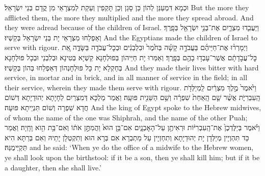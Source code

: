 {וּכְמָא דִּמְעַנַּן לְהוֹן כֵּן סָגַן וְכֵן תָּקְפִין וְעַקַת לְמִצְרָאֵי מִן קֳדָם בְּנֵי יִשְׂרָאֵל׃}
{But the more they afflicted them, the more they multiplied and the more they spread abroad. And they were adread because of the children of Israel.}{}
{וַיַּעֲבִ֧דוּ מִצְרַ֛יִם אֶת־בְּנֵ֥י יִשְׂרָאֵ֖ל בְּפָֽרֶךְ׃
}
{וְאַפְלַחוּ מִצְרָאֵי יָת בְּנֵי יִשְׂרָאֵל בְּקַשְׁיוּ׃}
{And the Egyptians made the children of Israel to serve with rigour.}{}
{וַיְמָרְר֨וּ אֶת־חַיֵּיהֶ֜ם בַּעֲבֹדָ֣ה קָשָׁ֗ה בְּחֹ֙מֶר֙ וּבִלְבֵנִ֔ים וּבְכׇל־עֲבֹדָ֖ה בַּשָּׂדֶ֑ה אֵ֚ת כׇּל־עֲבֹ֣דָתָ֔ם אֲשֶׁר־עָבְד֥וּ בָהֶ֖ם בְּפָֽרֶךְ׃}
{וְאַמַּרוּ יָת חַיֵּיהוֹן בְּפוּלְחָנָא קַשְׁיָא בְּטִינָא וּבְלִבְנֵי וּבְכָל פּוּלְחָנָא בְּחַקְלָא יָת כָּל פּוּלְחָנְהוֹן דְּאַפְלַחוּ בְּהוֹן בְּקַשְׁיוּ׃}
{And they made their lives bitter with hard service, in mortar and in brick, and in all manner of service in the field; in all their service, wherein they made them serve with rigour.}{}
{וַיֹּ֙אמֶר֙ מֶ֣לֶךְ מִצְרַ֔יִם לַֽמְיַלְּדֹ֖ת הָֽעִבְרִיֹּ֑ת אֲשֶׁ֨ר שֵׁ֤ם הָֽאַחַת֙ שִׁפְרָ֔ה וְשֵׁ֥ם הַשֵּׁנִ֖ית פּוּעָֽה׃
}
{וַאֲמַר מַלְכָּא דְּמִצְרַיִם לְחָיָתָא יְהוּדַיָתָא דְּשׁוֹם חֲדָא שִׁפְרָה וְשׁוֹם תִּנְיֵיתָא פּוּעָה׃}
{And the king of Egypt spoke to the Hebrew midwives, of whom the name of the one was Shiphrah, and the name of the other Puah;}{}
{וַיֹּ֗אמֶר בְּיַלֶּדְכֶן֙ אֶת־הָֽעִבְרִיּ֔וֹת וּרְאִיתֶ֖ן עַל־הָאׇבְנָ֑יִם אִם־בֵּ֥ן הוּא֙ וַהֲמִתֶּ֣ן אֹת֔וֹ וְאִם־בַּ֥ת הִ֖וא וָחָֽיָה׃
}
{וַאֲמַר כַּד תִּהְוְיָין מְיַלְּדָן יָת יְהוּדַיָתָא וְתִחְזְיָין עַל מַתְבְרָא אִם בְּרָא הוּא וְתִקְטְלָן יָתֵיהּ וְאִם בְּרַתָּא הִיא תְּקַיְּימֻנַּהּ׃}
{and he said: ‘When ye do the office of a midwife to the Hebrew women, ye shall look upon the birthstool: if it be a son, then ye shall kill him; but if it be a daughter, then she shall live.’}{}
